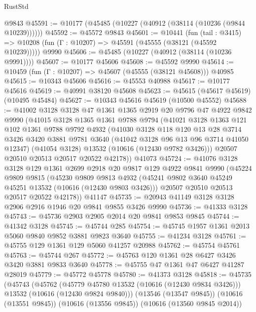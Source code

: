 \begin{lexlean}{RustStd}
\begin{coremodule}
    @9843
@45591 := @10177 (@45485 (@10227 (@40912 (@38114 (@10236 (@9844 @10239))))))
@45592 := @45572 @9843
@45601 := @10441
    (fun (tail : @3415) => @10208 (fun (Γ : @10207) => @45591 (@45555 (@38121 (@45592 @10239)))))
    @9990
@45606 := @45485 (@10227 (@40912 (@38114 (@10236 @9991))))
@45607 := @10177 @45606
@45608 := @45592 @9990
@45614 := @10459 (fun (Γ : @10207) => @45607 (@45555 (@38121 @45608))) @40985
@45615 := @10343 @45606
@45616 := @45553 @40988
@45617 := @10177 @45616
@45619 := @40991 @38120 @45608
@45623 := @45615 (@45617 @45619) (@10495 @45484)
@45627 := @10343 @45616 @45619 (@10500 @45552)
@45688 := @41002
    @3128
    @3128
    @47
    @1361
    @1365
    @2919
    @20
    @9796
    @47
    @4922
    @9842
    @9990
    (@41015
      @3128
      @1365
      @1361
      @9788
      @9794
      (@41021
        @3128
        @1363
        @121
        @102
        @1361
        @9788
        @9792
        @4932
        (@41030
          @3128
          @118
          @120
          @13
          @28
          @3714
          @3426
          @3420
          @3881
          @9781
          @3640
          (@41042 @3128 @96 @13 @96 @3714 @41050 @12347)
          (@41054 @3128)
          @13532
          (@10616 (@12430 @9782 @3426)))
        @20507
        @20510
        @20513
        @20517
        @20522
        @42178))
    @41073
@45724 := @41076
    @3128
    @3128
    @129
    @1361
    @2699
    @2918
    @20
    @9817
    @129
    @4922
    @9841
    @9990
    (@45224
      @9809
      @9815
      (@45230
        @9809
        @9813
        @4932
        (@45241 @9802 @3640 @45249 @45251 @13532 (@10616 (@12430 @9803 @3426)))
        @20507
        @20510
        @20513
        @20517
        @20522
        @42178))
    @41147
@45735 := @20943 @41149 @3128 @3128 @2906 @2916 @1946 @20 @9841 @9855 @3426 @9990
@45736 := @41333 @3128
@45743 := @45736 @2903 @2905 @2014 @20 @9841 @9853 @9845
@45744 := @41342 @3128
@45745 := @45744 @285
@45754 := @45745 @1957 @1361 @2013 @5060 @9840 @9852 @3881 @9823 @3640
@45755 := @41234 @3128
@45761 := @45755 @129 @1361 @129 @5060 @41257 @20988
@45762 := @45754 @45761
@45763 := @45744 @267
@45772 := @45763 @120 @1361 @28 @6427 @3426 @3420 @3881 @9833 @3640
@45778 := @45755 @47 @1361 @47 @6427 @41287 @28019
@45779 := @45772 @45778
@45780 := @41373 @3128
@45818 := @45735
    (@45743
      (@45762
        (@45779 @45780 @13532 (@10616 (@12430 @9834 @3426)))
        @13532
        (@10616 (@12430 @9824 @9840)))
      (@13546 (@13547 @9845))
      (@10616 (@13551 @9845))
      (@10616 (@13556 @9845))
      (@10616 (@13560 @9845 @2014))

\end{coremodule}
\end{lexlean}
